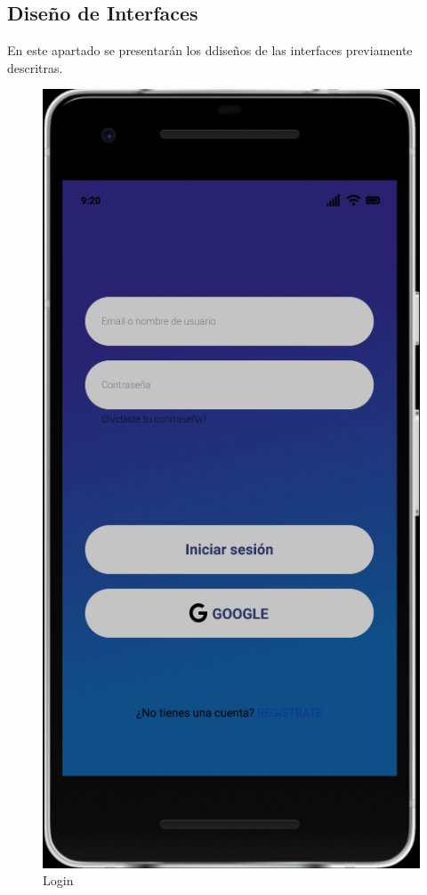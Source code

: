 \documentclass{article}
\begin{document}
\subsection{Diseño de Interfaces}%
En este apartado se presentarán los ddiseños de las interfaces previamente descritras.
\pagebreak
\begin{figure}[H]
    \centering
    \includegraphics[scale=0.9]{imgs/Figma/Login}
    \caption{Login}
\end{figure}
\end{document}
